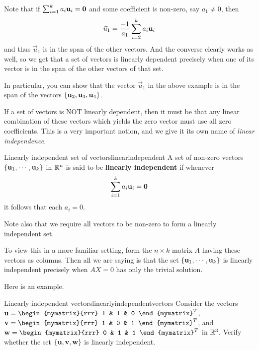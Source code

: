 Note that if $\sum_{i=1}^{k}a_{i}{\bf u}_{i}={\bf 0}$ and some
coefficient is non-zero, say $a_1 \neq 0$, then 
\begin{equation*}
\vec{u}_1 = \frac{-1}{a_1} \sum_{i=2}^{k}a_{i}{\bf u}_{i} 
\end{equation*}
and thus $\vec{u}_1$ is in the span of the other vectors. And the converse clearly works as well,
so we get that a set of vectors is linearly dependent precisely when
one of its vector is in the span of the other vectors of that set.

In particular, you can show that the vector $\vec{u}_1$ in the above
example is in the span of the vectors  $\{{\bf u}_2, {\bf u}_3, {\bf u}_4\}$. 

If a set of vectors is NOT linearly dependent, then it must be that
any linear combination of these vectors which yields the zero vector
must use all zero coefficients. This is a very important notion, and we give it its own name of {\em
linear independence}. 

\begin{definition}{Linearly independent set of vectors}{linearindependent}
A set of non-zero vectors $\{{\bf u}_1, \cdots ,{\bf u}_k\}$ in $\mathbb{R}^{n}$ is said to be 
\textbf{linearly independent} if whenever 
\begin{equation*}
\sum_{i=1}^{k}a_{i}{\bf u}_{i}={\bf 0}
\end{equation*}
it follows that each $a_{i}=0$.
\end{definition}


Note also that we require all vectors to be non-zero to form a
linearly independent set.

To view this in a more familiar setting, form the $n \times k$ matrix
$A$ having these vectors as columns. Then all we are saying is that
the set $\{{\bf u}_1, \cdots ,{\bf u}_k\}$ is linearly independent
precisely when $AX=0$ has only the trivial solution.

Here is an example.  

\begin{example}{Linearly independent vectors}{linearlyindependentvectors}
Consider the vectors $\vect{u}=\begin{mymatrix}{rrr}
1  & 1 & 0
\end{mymatrix}^T$, 
$\vect{v}=\begin{mymatrix}{rrr}
1  & 0 & 1
\end{mymatrix}^T$, and
$\vect{w}=\begin{mymatrix}{rrr}
0  & 1 & 1
\end{mymatrix}^T$ in $\mathbb{R}^{3}$.
Verify whether the set $\{{\bf u}, {\bf v}, {\bf w}\}$ is linearly independent. 
\end{example}

